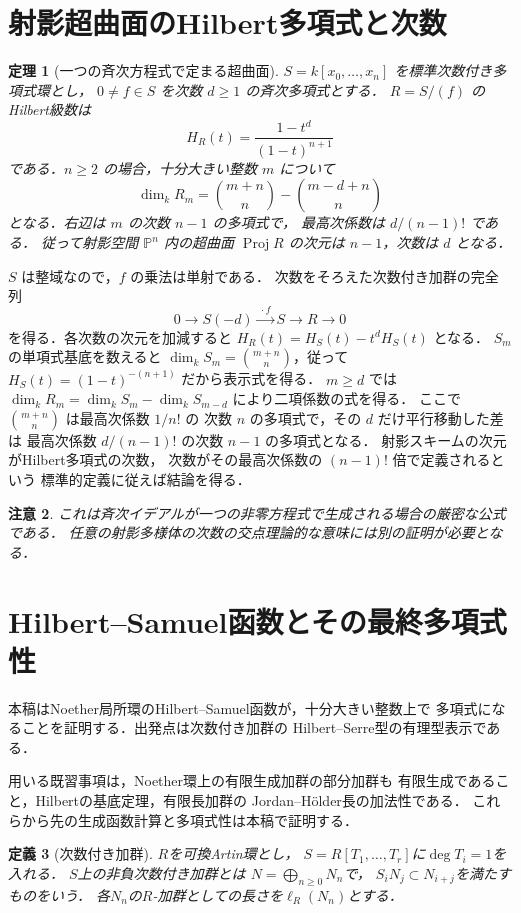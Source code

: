 \documentclass[a5paper,10pt,onecolumn]{jsarticle}
\makeatletter
\theoremstyle{mathnotetheorem}
\newtheorem{theorem}{定理}[section]
\newtheorem{definition}[theorem]{定義}
\newtheorem{remark}[theorem]{注意}
\renewcommand{\proofname}{証明}
\renewenvironment{proof}[1][\proofname]{%
  \par\pushQED{\qed}\normalfont\topsep4\p@\@plus2\p@\relax
  \trivlist\item[\hskip\labelsep\bfseries #1]\ignorespaces
}{\popQED\endtrivlist\@endpefalse}
\makeatother
\begin{document}
\section{射影超曲面のHilbert多項式と次数}
\begin{theorem}[一つの斉次方程式で定まる超曲面]
$S=k[x_0,\ldots,x_n]$ を標準次数付き多項式環とし，
$0\ne f\in S$ を次数 $d\ge1$ の斉次多項式とする．
$R=S/(f)$ のHilbert級数は
\[
 H_R(t)=\frac{1-t^d}{(1-t)^{n+1}}
\]
である．$n\ge2$ の場合，十分大きい整数 $m$ について
\[
 \dim_k R_m={m+n\choose n}-{m-d+n\choose n}
\]
となる．右辺は $m$ の次数 $n-1$ の多項式で，
最高次係数は $d/(n-1)!$ である．
従って射影空間 $\mathbb P^n$ 内の超曲面
$\operatorname{Proj}R$ の次元は $n-1$，次数は $d$ となる．
\end{theorem}
\begin{proof}
$S$ は整域なので，$f$ の乗法は単射である．
次数をそろえた次数付き加群の完全列
\[
 0\longrightarrow S(-d)
 \xrightarrow{\ \cdot f\ }S\longrightarrow R\longrightarrow0
\]
を得る．各次数の次元を加減すると
$H_R(t)=H_S(t)-t^dH_S(t)$ となる．
$S_m$ の単項式基底を数えると
$\dim_k S_m={m+n\choose n}$，従って
$H_S(t)=(1-t)^{-(n+1)}$ だから表示式を得る．
$m\ge d$ では
$\dim_k R_m=\dim_k S_m-\dim_k S_{m-d}$ により二項係数の式を得る．
ここで $\binom{m+n}{n}$ は最高次係数 $1/n!$ の
次数 $n$ の多項式で，その $d$ だけ平行移動した差は
最高次係数 $d/(n-1)!$ の次数 $n-1$ の多項式となる．
射影スキームの次元がHilbert多項式の次数，
次数がその最高次係数の $(n-1)!$ 倍で定義されるという
標準的定義に従えば結論を得る．
\end{proof}
\begin{remark}
これは斉次イデアルが一つの非零方程式で生成される場合の厳密な公式である．
任意の射影多様体の次数の交点理論的な意味には別の証明が必要となる．
\end{remark}


\section{Hilbert--Samuel函数とその最終多項式性}
本稿はNoether局所環のHilbert--Samuel函数が，十分大きい整数上で
多項式になることを証明する．出発点は次数付き加群の
Hilbert--Serre型の有理型表示である．

用いる既習事項は，Noether環上の有限生成加群の部分加群も
有限生成であること，Hilbertの基底定理，有限長加群の
Jordan--H\"older長の加法性である．
これらから先の生成函数計算と多項式性は本稿で証明する．

\begin{definition}[次数付き加群]
$R$を可換Artin環とし，
$S=R[T_1,\ldots,T_r]$に$\deg T_i=1$を入れる．
$S$上の\emph{非負次数付き加群}とは
$N=\bigoplus_{n\ge0}N_n$で，
$S_iN_j\subset N_{i+j}$を満たすものをいう．
各$N_n$の$R$-加群としての長さを$\ell_R(N_n)$とする．
\end{definition}
\end{document}
